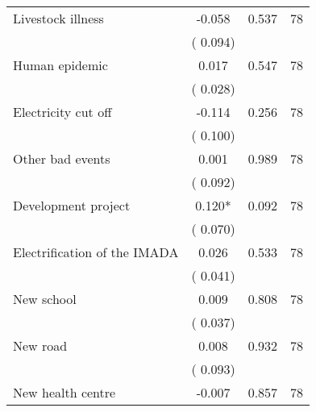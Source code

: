 \begin{tabular}{l*{3}{c}}
 Livestock illness                 &             -0.058          &        0.537 & 78          \\ 
                               &        (       0.094)             &                        &                              \\ 
 Human epidemic                &              0.017        &        0.547   & 78              \\ 
                               &        (       0.028)            &                               &                               \\ 
 Electricity cut off                &             -0.114        &        0.256   & 78              \\ 
                               &        (       0.100)            &                               &                               \\ 
 Other bad events                &              0.001        &        0.989   & 78              \\ 
                               &        (       0.092)            &                               &                               \\ 
 Development project                &              0.120*        &        0.092   & 78              \\ 
                               &        (       0.070)            &                               &                               \\ 
 Electrification of the IMADA                &              0.026        &        0.533   & 78              \\ 
                               &        (       0.041)            &                               &                               \\ 
 New school                &              0.009        &        0.808   & 78              \\ 
                               &        (       0.037)            &                               &                               \\ 
 New road                &              0.008        &        0.932   & 78              \\ 
                               &        (       0.093)            &                               &                               \\ 
 New health centre                &             -0.007        &        0.857   & 78              \\ 

\end{tabular}
